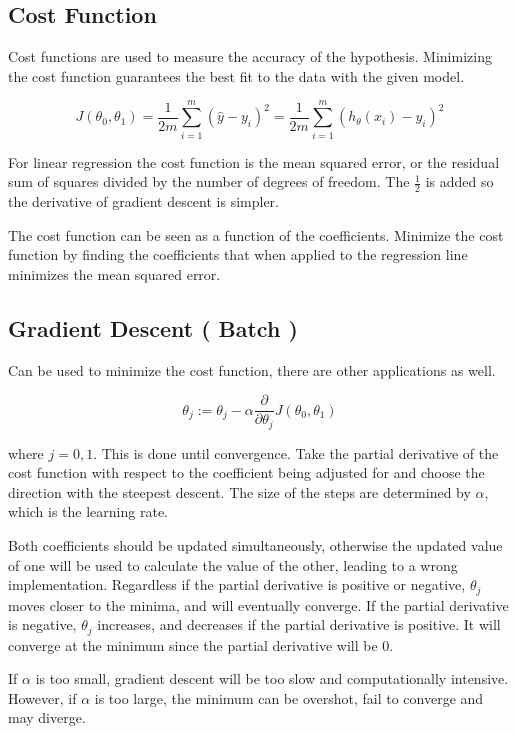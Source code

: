 \documentclass[
]{article}
\author{}
\date{}
\begin{document}
\hypertarget{header-n0}{%
\subsection{Cost Function}\label{header-n0}}

Cost functions are used to measure the accuracy of the hypothesis.
Minimizing the cost function guarantees the best fit to the data with
the given model.

\[J(\theta_0, \theta_1) = \frac{1}{2m}\sum^m_{i=1}(\hat{y}-y_i)^2 = \frac{1}{2m}\sum^m_{i=1}(h_\theta(x_i)-y_i)^2\]

For linear regression the cost function is the mean squared error, or
the residual sum of squares divided by the number of degrees of freedom.
The \(\frac{1}{2}\) is added so the derivative of gradient descent is
simpler.

The cost function can be seen as a function of the coefficients.
Minimize the cost function by finding the coefficients that when applied
to the regression line minimizes the mean squared error.

\hypertarget{header-n6}{%
\subsection{Gradient Descent ( Batch )}\label{header-n6}}

Can be used to minimize the cost function, there are other applications
as well.

\[\theta_j := \theta_j - \alpha\frac{\partial}{\partial\theta_j}J(\theta_0, \theta_1)\]

where \(j=0,1\). This is done until convergence. Take the partial
derivative of the cost function with respect to the coefficient being
adjusted for and choose the direction with the steepest descent. The
size of the steps are determined by \(\alpha\), which is the learning
rate.

Both coefficients should be updated simultaneously, otherwise the
updated value of one will be used to calculate the value of the other,
leading to a wrong implementation. Regardless if the partial derivative
is positive or negative, \(\theta_j\) moves closer to the minima, and
will eventually converge. If the partial derivative is negative,
\(\theta_j\) increases, and decreases if the partial derivative is
positive. It will converge at the minimum since the partial derivative
will be 0.

If \(\alpha\) is too small, gradient descent will be too slow and
computationally intensive. However, if \(\alpha\) is too large, the
minimum can be overshot, fail to converge and may diverge.
\end{document}
